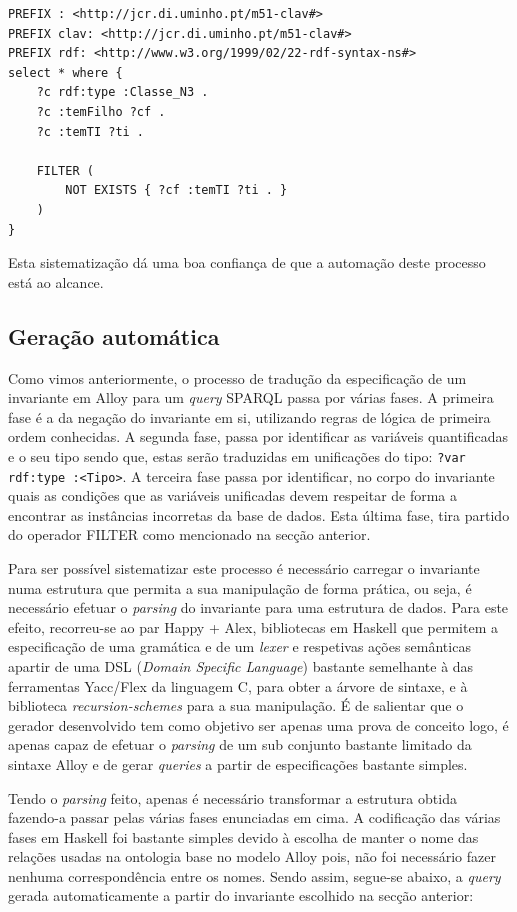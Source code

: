 \documentclass[tikz,runningheads,a4paper]{llncs}
\begin{document}
\begin{verbatim}
PREFIX : <http://jcr.di.uminho.pt/m51-clav#>
PREFIX clav: <http://jcr.di.uminho.pt/m51-clav#>
PREFIX rdf: <http://www.w3.org/1999/02/22-rdf-syntax-ns#>
select * where { 
    ?c rdf:type :Classe_N3 .
    ?c :temFilho ?cf .
    ?c :temTI ?ti .
   	
    FILTER (
        NOT EXISTS { ?cf :temTI ?ti . }
	)
}
\end{verbatim} 

Esta sistematização dá uma boa confiança de que a automação deste processo está
ao alcance.

\subsection{Geração automática}

Como vimos anteriormente, o processo de tradução da especificação de um
invariante em Alloy para um \textit{query} SPARQL passa por várias fases. A
primeira fase é a da negação do invariante em si, utilizando regras de lógica de
primeira ordem conhecidas. A segunda fase, passa por identificar as variáveis
quantificadas e o seu tipo sendo que, estas serão traduzidas em unificações do
tipo: \texttt{?var rdf:type :<Tipo>}. A terceira fase passa por identificar, no
corpo do invariante quais as condições que as variáveis unificadas devem
respeitar de forma a encontrar as instâncias incorretas da base de dados. Esta
última fase, tira partido do operador FILTER como mencionado na secção anterior.

Para ser possível sistematizar este processo é necessário carregar o invariante
numa estrutura que permita a sua manipulação de forma prática, ou seja, é
necessário efetuar o \textit{parsing} do invariante para uma estrutura de dados.
Para este efeito, recorreu-se ao par Happy + Alex, bibliotecas em Haskell que
permitem a especificação de uma gramática e de um \textit{lexer} e respetivas
ações semânticas apartir de uma DSL (\textit{Domain Specific Language}) bastante
semelhante à das ferramentas Yacc/Flex da linguagem C, para obter a árvore de
sintaxe, e à biblioteca \textit{recursion-schemes} para a sua manipulação. É de
salientar que o gerador desenvolvido tem como objetivo ser apenas uma prova de
conceito logo, é apenas capaz de efetuar o \textit{parsing} de um sub conjunto
bastante limitado da sintaxe Alloy e de gerar \textit{queries} a partir de
especificações bastante simples.

Tendo o \textit{parsing} feito, apenas é necessário transformar a estrutura
obtida fazendo-a passar pelas várias fases enunciadas em cima. A codificação das
várias fases em Haskell foi bastante simples devido à escolha de manter o nome
das relações usadas na ontologia base no modelo Alloy pois, não foi necessário
fazer nenhuma correspondência entre os nomes. Sendo assim, segue-se abaixo, a
\textit{query} gerada automaticamente a partir do invariante escolhido na secção
anterior:
\end{document}
